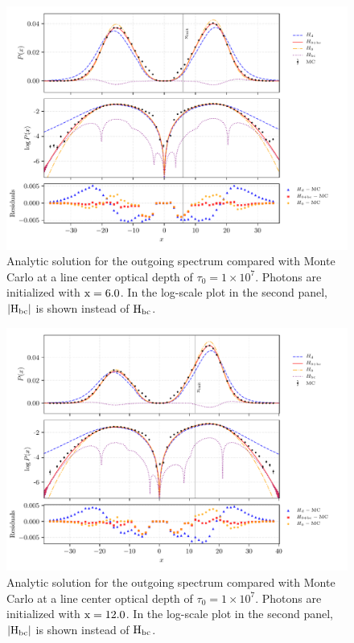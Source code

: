 \documentclass{aastex63}
\begin{document}
\begin{figure}
    \centering
    \includegraphics{pdf_xinit6.0.pdf}
    \caption{Analytic solution for the outgoing spectrum compared with Monte Carlo at a line center optical depth of $\tau_0 = 1 \times 10^7$. Photons are initialized with $\rm x = 6.0$. In the log-scale plot in the second panel, $|\rm H_{bc}|$ is shown instead of $\rm H_{bc}$.} 
    \label{fig:sol_mc_residual_6}
\end{figure}

\begin{figure}
    \centering
    \includegraphics{pdf_xinit12.0.pdf}
    \caption{Analytic solution for the outgoing spectrum compared with Monte Carlo at a line center optical depth of $\tau_0 = 1 \times 10^7$. Photons are initialized with $\rm x = 12.0$. In the log-scale plot in the second panel, $|\rm H_{bc}|$ is shown instead of $\rm H_{bc}$.} 
    \label{fig:sol_mc_residual_12}
\end{figure}
\end{document}
